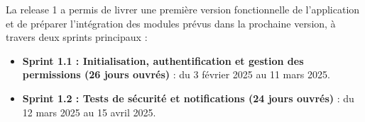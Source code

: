 La release 1 a permis de livrer une première version fonctionnelle de l’application et de préparer l’intégration des modules prévus dans la prochaine version, à travers deux sprints principaux :
\begin{itemize}[label=$\bullet$]
    \item \textbf{Sprint 1.1 : Initialisation, authentification et gestion des permissions (26 jours ouvrés)} : du 3 février 2025 au 11 mars 2025.
    \item \textbf{Sprint 1.2 : Tests de sécurité et notifications (24 jours ouvrés)} : du 12 mars 2025 au 15 avril 2025.
\end{itemize}


